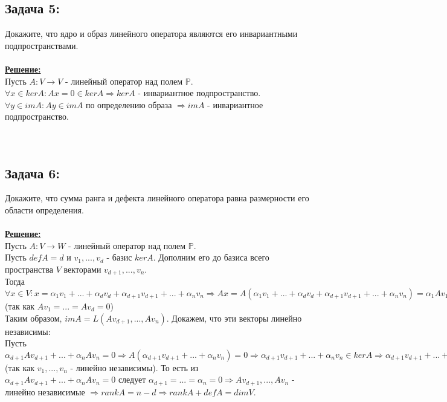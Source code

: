 \documentclass[a4paper,12pt,titlepage,final]{article}
\begin{document}
\subsection*{Задача 5:}
\noindent Докажите, что ядро и образ линейного оператора являются его инвариантными подпространствами. \\ \\
\textbf{\underline{Решение:}} \\
Пусть $A: V \rightarrow V$ - линейный оператор над полем $\mathbb{P}$. \\
$\forall x \in kerA: Ax = 0 \in kerA \Rightarrow kerA$ - инвариантное подпространство. \\
$\forall y \in imA: Ay \in imA$ по определению образа $\Rightarrow imA$ - инвариантное подпространство. \\ \\ \\


\subsection*{Задача 6:}
\noindent Докажите, что сумма ранга и дефекта линейного оператора равна размерности его области определения. \\ \\
\textbf{\underline{Решение:}} \\
Пусть $A: V \rightarrow W$ - линейный оператор над полем $\mathbb{P}$. \\
Пусть $defA = d$ и $v_1, ... , v_d$ - базис $kerA$. Дополним его до базиса всего пространства $V$ векторами $v_{d+1}, ... , v_n$. \\
Тогда $\forall x \in V: x = \alpha_1 v_1 + ... + \alpha_d v_d + \alpha_{d+1} v_{d+1} + ... + \alpha_n v_n \Rightarrow
Ax = A(\alpha_1 v_1 + ... + \alpha_d v_d + \alpha_{d+1} v_{d+1} + ... + \alpha_n v_n) =
\alpha_1 Av_1 + ... + \alpha_d Av_d + \alpha_{d+1} Av_{d+1} + ... + \alpha_n Av_n = \alpha_{d+1} Av_{d+1} + ... + \alpha_n Av_n$ (так как $Av_1 = ... = Av_d = 0$) \\
Таким образом, $imA = L(Av_{d+1}, ... , Av_n)$. Докажем, что эти векторы линейно независимы: \\
Пусть $\alpha_{d+1} Av_{d+1} + ... + \alpha_n Av_n = 0 \Rightarrow A(\alpha_{d+1} v_{d+1} + ... + \alpha_n v_n) = 0
\Rightarrow \alpha_{d+1} v_{d+1} + ... + \alpha_n v_n \in kerA \Rightarrow \alpha_{d+1} v_{d+1} + ... + \alpha_n v_n = \alpha_1 v_1 + ... + \alpha_d v_d \Rightarrow
\alpha_1 v_1 + ... + \alpha_d v_d - \alpha_{d+1} v_{d+1} - ... - \alpha_n v_n = 0 \Rightarrow \alpha_{d+1} = ... = \alpha_n = 0$ (так как $v_1, ... , v_n$ - линейно независимы).
То есть из $\alpha_{d+1} Av_{d+1} + ... + \alpha_n Av_n = 0$ следует $\alpha_{d+1} = ... = \alpha_n = 0 \Rightarrow Av_{d+1}, ... , Av_n$ - линейно независимые
$\Rightarrow rankA = n - d \Rightarrow rankA + defA = dimV$. \\ \\ \\
\end{document}
